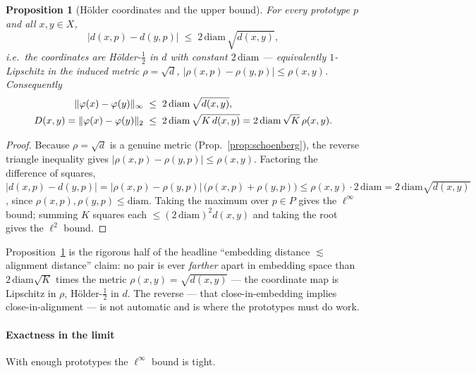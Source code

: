 \documentclass[11pt]{article}
\theoremstyle{oldplain}
\newtheorem{proposition}{Proposition}
\theoremstyle{oldrem}
\DeclarePairedDelimiter{\norm}{\lVert}{\rVert}
\begin{document}
\begin{proposition}[H\"older coordinates and the upper bound]\label{prop:lipschitz}
For every prototype $p$ and all $x,y\in X$,
\begin{equation}\label{eq:holder}
  \lvert d(x,p)-d(y,p)\rvert \;\le\; 2\,\mathrm{diam}\,\sqrt{d(x,y)},
\end{equation}
i.e.\ the coordinates are H\"older-$\tfrac12$ in $d$ with constant $2\,\mathrm{diam}$ --- equivalently
$1$-Lipschitz in the induced metric $\rho=\sqrt d$, $\lvert\rho(x,p)-\rho(y,p)\rvert\le\rho(x,y)$.
Consequently
\begin{equation}\label{eq:upper}
\begin{aligned}
  \norm{\varphi(x)-\varphi(y)}_\infty &\;\le\; 2\,\mathrm{diam}\,\sqrt{d(x,y)},\\
  D(x,y)=\norm{\varphi(x)-\varphi(y)}_2 &\;\le\; 2\,\mathrm{diam}\,\sqrt{K\,d(x,y)}
  = 2\,\mathrm{diam}\,\sqrt{K}\,\rho(x,y).
\end{aligned}
\end{equation}
\end{proposition}
\begin{proof}
Because $\rho=\sqrt d$ is a genuine metric (Prop.~\ref{prop:schoenberg}), the reverse triangle inequality
gives $\lvert\rho(x,p)-\rho(y,p)\rvert\le\rho(x,y)$. Factoring the difference of squares,
$\lvert d(x,p)-d(y,p)\rvert=\lvert\rho(x,p)-\rho(y,p)\rvert\,\bigl(\rho(x,p)+\rho(y,p)\bigr)
\le\rho(x,y)\cdot 2\,\mathrm{diam}=2\,\mathrm{diam}\sqrt{d(x,y)}$, since $\rho(x,p),\rho(y,p)\le\mathrm{diam}$.
Taking the maximum over $p\in P$ gives the $\ell^\infty$ bound; summing $K$ squares each
$\le(2\,\mathrm{diam})^2 d(x,y)$ and taking the root gives the $\ell^2$ bound.
\end{proof}

Proposition~\ref{prop:lipschitz} is the rigorous half of the headline ``embedding distance $\lesssim$
alignment distance'' claim: no pair is ever \emph{farther} apart in embedding space than
$2\,\mathrm{diam}\sqrt K$ times the metric $\rho(x,y)=\sqrt{d(x,y)}$ --- the coordinate map is Lipschitz
in $\rho$, H\"older-$\tfrac12$ in $d$. The reverse --- that close-in-embedding implies close-in-alignment
--- is not automatic and is where the prototypes must do work.

\paragraph{Exactness in the limit} With enough prototypes the $\ell^\infty$ bound is tight.
\end{document}
